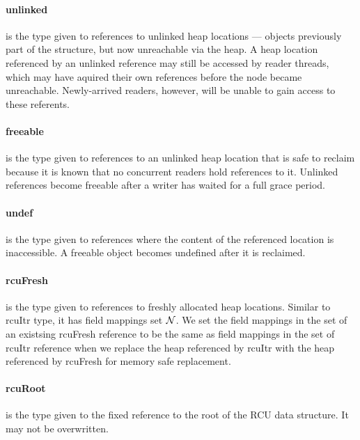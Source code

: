 \paragraph{unlinked} is the type given to references to unlinked heap locations --- objects previously part of the structure, but now unreachable via the heap. A heap location referenced by an unlinked reference may still be accessed by reader threads, which may have aquired their own references before the node became unreachable.  Newly-arrived readers, however, will be unable to gain access to these referents.
\paragraph{freeable} is the type given to references to an unlinked heap location that is safe to reclaim because it is known that no concurrent readers hold references to it.
Unlinked references become freeable after a writer has waited for a full grace period.
\paragraph{undef} is the type given to references where the content of the referenced location is inaccessible. A freeable object becomes undefined after it is reclaimed.
\paragraph{rcuFresh} is the type given to references to freshly allocated heap locations. Similar to \textsf{rcuItr} type, it has field mappings set $\mathcal{N}$. We set the field mappings in the set of an existsing \textsf{rcuFresh} reference to be the same as field mappings in the set of \textsf{rcuItr} reference when we replace the heap referenced by \textsf{rcuItr} with the heap referenced by \textsf{rcuFresh} for memory safe replacement.
\paragraph{rcuRoot} is the type given to the fixed reference to the root of the RCU data structure.  It may not be overwritten.

